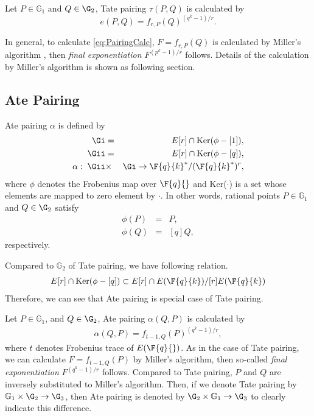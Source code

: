 Let $P\in\mathbb{G}_1$ and $Q\in\G_2$, Tate pairing $\tau(P,Q)$ is calculated by
\begin{equation}
e(P,Q) = f_{r,P}(Q)^{(q^{k}-1)/r}. \label{eq:PairingCalc}
\end{equation}

In general, to calculate \eqref{eq:PairingCalc}, $F=f_{r,P}(Q)$ is calculated by Miller's algorithm \cite{Handbook}, then {\it final exponentiation} $F^{(p^k-1)/r}$ follows.
Details of the calculation by Miller's algorithm is shown as following section. 

\subsection{Ate Pairing}
Ate pairing $\alpha$ \cite{PAIRING:Hess08} is defined by
\begin{eqnarray}
\Gi &=& E[r]\cap {\rm Ker}(\phi-[1]), \nonumber \\
\Gii &=& E[r]\cap {\rm Ker}(\phi-[q]), \nonumber \\
\alpha :\;\Gii &\times& \Gi \rightarrow \F{q}{k} ^*/(\F{q}{k} ^*)^r, \label{eq:AteDef}
\end{eqnarray}
where $\phi$ denotes the Frobenius map over $\F{q}{}$ and Ker($\cdot $) is a set whose elements are mapped to zero element by $\cdot $.
In other words, rational points $P\in\mathbb{G}_1$ and $Q\in\G_2$ satisfy 
\begin{eqnarray}
\phi(P) &=& P, \\
\phi(Q) &=& [q]Q,
\end{eqnarray}
respectively.  

Compared to $\mathbb{G}_2$ of Tate pairing, we have following relation.
\begin{eqnarray}
E[r]\cap {\rm Ker}(\phi-[q]) \subset E[r]\cap E(\F{q}{k})/[r]E(\F{q}{k})
\end{eqnarray}
Therefore, we can see that Ate pairing is special case of Tate pairing. 

Let $P\in\mathbb{G}_1$, and $Q\in\G_2$, Ate pairing $\alpha(Q,P)$ is calculated by
\begin{eqnarray}
\alpha(Q,P) = f_{t-1,Q}(P)^{(q^{k}-1)/r}, \label{eq:AteCalc}
\end{eqnarray}
where $t$ denotes Frobenius trace of $E(\F{q}{})$.
As in the case of Tate pairing, we can calculate $F=f_{t-1,Q}(P)$ by Miller's algorithm, then so-called {\it final exponentiation} $F^{(q^{k}-1)/r}$ follows.
Compared to Tate pairing, $P$ and $Q$ are inversely substituted to Miller's algorithm.
Then, if we denote Tate pairing by $\mathbb{G}_1 \times \G_2 \rightarrow \G_3$, then Ate pairing is denoted  by $\G_2 \times \mathbb{G}_1 \rightarrow \G_3$ to clearly indicate this difference. 

